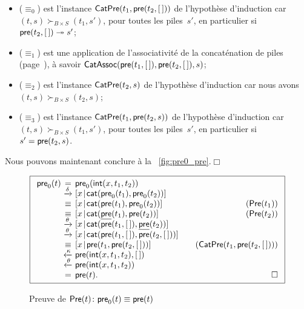 \begin{itemize}

  \item (\(\equiv_0\)) est l'instance
  \(\textsf{CatPre}({t_1,\textsf{pre}(t_2,[\,])})\) de l'hypothèse d'induction
  car \((t,s) \succ_{B \times S} (t_1,s')\), pour toutes les
  piles~\(s'\), en particulier si \(\textsf{pre}(t_2,[\,])
  \twoheadrightarrow s'\);

  \item (\(\equiv_1\)) est une application de l'associativité de la
  concaténation de piles
  (page~\pageref{proof_assoc_cat}), à savoir
  \(\textsf{CatAssoc}({\textsf{pre}(t_1,[\,]),\textsf{pre}(t_2,[\,]),s})\);

  \item (\(\equiv_2\)) est l'instance
  \(\textsf{CatPre}({t_2,s})\) de
  l'hypothèse d'induction car nous avons \((t,s) \succ_{B \times S}
  (t_2,s)\);

  \item (\(\equiv_3\)) est l'instance \(\textsf{CatPre}({t_1,
    \textsf{pre}(t_2,s)})\) de l'hypothèse d'induction car \((t,s)
  \succ_{B \times S} (t_1,s')\), pour toutes les piles~\(s'\), en
  particulier si \(s' = \textsf{pre}(t_2,s)\).
\end{itemize}
Nous pouvons maintenant conclure à la \fig~\vref{fig:pre0_pre}.\hfill\(\Box\)
\begin{figure}
\begin{equation*}
\boxed{%
\begin{array}{r@{\;}c@{\;}l@{\qquad}r}
\fun{pre}_0(t)
& = & \fun{pre}_0(\fun{int}(x,t_1,t_2))\\
& \xrightarrow{\smash{\delta}}
& \cons{x}{\fun{cat}(\fun{pre}_0(t_1), \fun{pre}_0(t_2))}\\
& \equiv & \cons{x}{\fun{cat}(\fun{pre}(t_1), \fun{pre}_0(t_2))}
& (\pred{Pre}{t_1})\\
& \equiv & \cons{x}{\fun{cat}(\ufun{pre}(t_1), \fun{pre}(t_2))}
& (\pred{Pre}{t_2})\\
& \xrightarrow{\smash{\theta}}
& \cons{x}{\fun{cat}(\fun{pre}(t_1,\el), \ufun{pre}(t_2))}\\
& \xrightarrow{\smash{\theta}}
& \cons{x}{\fun{cat}(\fun{pre}(t_1,\el), \fun{pre}(t_2,\el))}\\
& \equiv
& \cons{x}{\fun{pre}(t_1,\fun{pre}(t_2,\el))}
& (\pred{CatPre}{t_1,\fun{pre}(t_2,\el)})\\
& \xleftarrow{\smash{\kappa}}
& \fun{pre}(\fun{int}(x,t_1,t_2),\el)\\
& \xleftarrow{\smash{\theta}}
& \fun{pre}(\fun{int}(x,t_1,t_2))\\
& = & \fun{pre}(t). & \hfill\Box
\end{array}}
\end{equation*}
\caption{Preuve de \(\textsf{Pre}({t}) \colon \textsf{pre}_0(t) \equiv
  \textsf{pre}(t)\)}
\label{fig:pre0_pre}
\end{figure}

